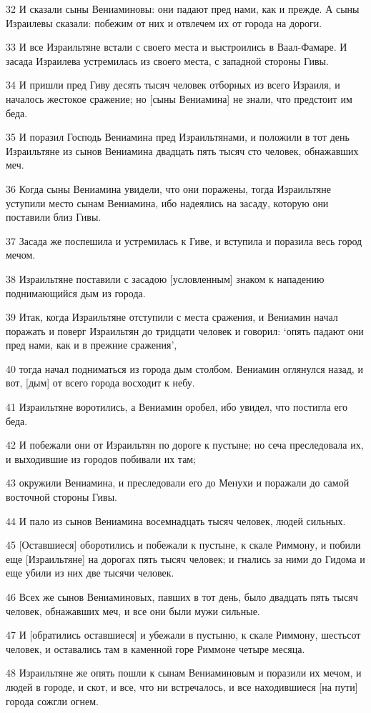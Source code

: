 \par 32 И сказали сыны Вениаминовы: они падают пред нами, как и прежде. А сыны Израилевы сказали: побежим от них и отвлечем их от города на дороги.
\par 33 И все Израильтяне встали с своего места и выстроились в Ваал-Фамаре. И засада Израилева устремилась из своего места, с западной стороны Гивы.
\par 34 И пришли пред Гиву десять тысяч человек отборных из всего Израиля, и началось жестокое сражение; но [сыны Вениамина] не знали, что предстоит им беда.
\par 35 И поразил Господь Вениамина пред Израильтянами, и положили в тот день Израильтяне из сынов Вениамина двадцать пять тысяч сто человек, обнажавших меч.
\par 36 Когда сыны Вениамина увидели, что они поражены, тогда Израильтяне уступили место сынам Вениамина, ибо надеялись на засаду, которую они поставили близ Гивы.
\par 37 Засада же поспешила и устремилась к Гиве, и вступила и поразила весь город мечом.
\par 38 Израильтяне поставили с засадою [условленным] знаком к нападению поднимающийся дым из города.
\par 39 Итак, когда Израильтяне отступили с места сражения, и Вениамин начал поражать и поверг Израильтян до тридцати человек и говорил: `опять падают они пред нами, как и в прежние сражения',
\par 40 тогда начал подниматься из города дым столбом. Вениамин оглянулся назад, и вот, [дым] от всего города восходит к небу.
\par 41 Израильтяне воротились, а Вениамин оробел, ибо увидел, что постигла его беда.
\par 42 И побежали они от Израильтян по дороге к пустыне; но сеча преследовала их, и выходившие из городов побивали их там;
\par 43 окружили Вениамина, и преследовали его до Менухи и поражали до самой восточной стороны Гивы.
\par 44 И пало из сынов Вениамина восемнадцать тысяч человек, людей сильных.
\par 45 [Оставшиеся] оборотились и побежали к пустыне, к скале Риммону, и побили еще [Израильтяне] на дорогах пять тысяч человек; и гнались за ними до Гидома и еще убили из них две тысячи человек.
\par 46 Всех же сынов Вениаминовых, павших в тот день, было двадцать пять тысяч человек, обнажавших меч, и все они были мужи сильные.
\par 47 И [обратились оставшиеся] и убежали в пустыню, к скале Риммону, шестьсот человек, и оставались там в каменной горе Риммоне четыре месяца.
\par 48 Израильтяне же опять пошли к сынам Вениаминовым и поразили их мечом, и людей в городе, и скот, и все, что ни встречалось, и все находившиеся [на пути] города сожгли огнем.

